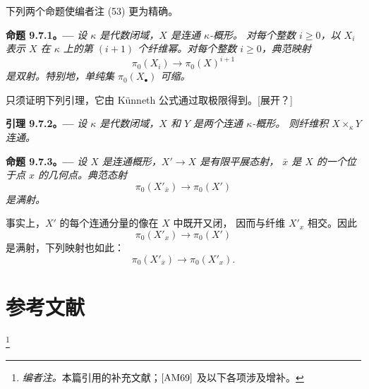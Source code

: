 下列两个命题使编者注 (53) 更为精确。

\par\medskip\noindent{}\textbf{命题 9.7.1。---}\enspace
\emph{设 \(\kappa\) 是代数闭域，\(X\) 是连通 \(\kappa\)-概形。
对每个整数 \(i\geq0\)，以 \(X_i\) 表示 \(X\) 在 \(\kappa\) 上的第
\((i+1)\) 个纤维幂。对每个整数 \(i\geq0\)，典范映射}
\[
  \pi_0(X_i)\longrightarrow\pi_0(X)^{i+1}
\]
\emph{是双射。特别地，单纯集 \(\pi_0(X_\bullet)\) 可缩。}

只须证明下列引理，它由 Künneth 公式通过取极限得到。[展开？]

\par\medskip\noindent{}\textbf{引理 9.7.2。---}\enspace
\emph{设 \(\kappa\) 是代数闭域，\(X\) 和 \(Y\) 是两个连通 \(\kappa\)-概形。
则纤维积 \(X\times_\kappa Y\) 连通。}

\par\medskip\noindent{}\textbf{命题 9.7.3。---}\enspace
\emph{设 \(X\) 是连通概形，\(X'\to X\) 是有限平展态射，
\(\bar{x}\) 是 \(X\) 的一个位于点 \(x\) 的几何点。典范态射}
\[
  \pi_0(X'_{\bar{x}})\longrightarrow\pi_0(X')
\]
\emph{是满射。}

事实上，\(X'\) 的每个连通分量的像在 \(X\) 中既开又闭，
因而与纤维 \(X'_x\) 相交。因此
\[
  \pi_0(X'_x)\longrightarrow\pi_0(X')
\]
是满射，下列映射也如此：
\[
  \pi_0(X'_{\bar{x}})\longrightarrow\pi_0(X'_x).
\]

\section*{参考文献}
\footnote{\textit{编者注。}本篇引用的补充文献；\([{\rm AM69}]\) 及以下各项涉及增补。}

